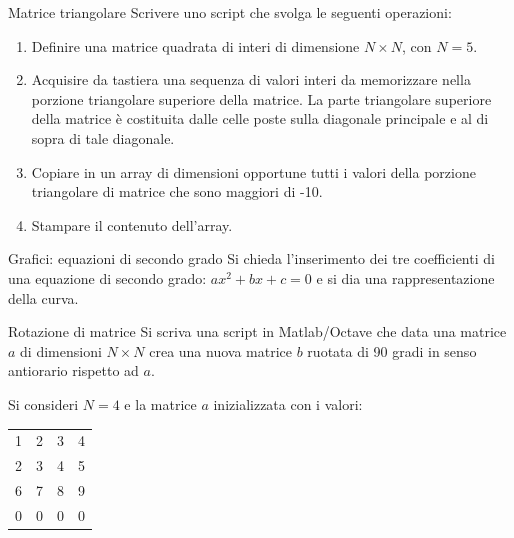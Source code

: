 \documentclass[aspectratio=169]{beamer}
\begin{document}
\begin{frame}{Matrice triangolare}
Scrivere uno script che svolga le seguenti operazioni:
\begin{enumerate}
	\item Definire una matrice quadrata di interi di dimensione $N\times N$, con $N=5$.
	\item Acquisire da tastiera una sequenza di valori interi da memorizzare nella porzione triangolare superiore della
        matrice. La parte triangolare superiore della matrice è costituita dalle celle poste sulla diagonale principale
        e al di sopra di tale diagonale.
	\item Copiare in un array di dimensioni opportune tutti i valori della porzione triangolare di matrice che sono maggiori di -10.
	\item Stampare il contenuto dell'array.
\end{enumerate}
\end{frame}

\begin{frame}{Grafici: equazioni di secondo grado}
Si chieda l’inserimento dei tre coefficienti di una equazione di secondo grado: $ax^2+bx+c=0$ e si dia una rappresentazione della curva.
\end{frame}

\begin{frame}{Rotazione di matrice}
Si scriva una script in Matlab/Octave che data una matrice $a$ di dimensioni $N\times N$ crea una nuova matrice $b$ ruotata di 90 gradi in senso antiorario rispetto ad $a$.

Si consideri $N=4$ e la matrice $a$ inizializzata con i valori:

\centering
\begin{tabular}{|cccc|}
	\hline
	1&2&3&4\\
	2&3&4&5\\
	6&7&8&9\\
	0&0&0&0\\
	\hline
\end{tabular}
\end{frame}
\end{document}
